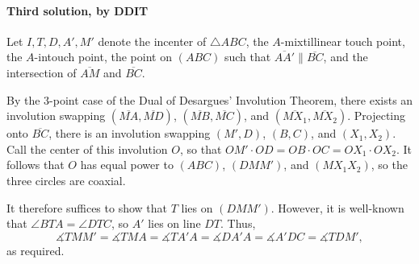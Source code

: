 \paragraph{Third solution, by DDIT}     Let $I,T,D,A',M'$ denote the incenter of $\triangle ABC$, the $A$-mixtillinear touch point, the $A$-intouch point, the point on $(ABC)$ such that $\overline{AA'}\parallel\overline{BC}$, and the intersection of $\overline{AM}$ and $\overline{BC}$.

By the $3$-point case of the Dual of Desargues' Involution Theorem, there exists an involution swapping $(\overline{MA},\overline{MD})$, $(\overline{MB},\overline{MC})$, and $(\overline{MX_1},\overline{MX_2})$. Projecting onto $\overline{BC}$, there is an involution swapping $(M',D)$, $(B,C)$, and $(X_1,X_2)$. Call the center of this involution $O$, so that $OM'\cdot OD=OB\cdot OC=OX_1\cdot OX_2$. It follows that $O$ has equal power to $(ABC)$, $(DMM')$, and $(MX_1X_2)$, so the three circles are coaxial.

It therefore suffices to show that $T$ lies on $(DMM')$. However, it is well-known that $\angle BTA=\angle DTC$, so $A'$ lies on line $DT$. Thus, \[\measuredangle TMM'=\measuredangle TMA=\measuredangle TA'A=\measuredangle DA'A=\measuredangle A'DC=\measuredangle TDM',\]
as required. 


